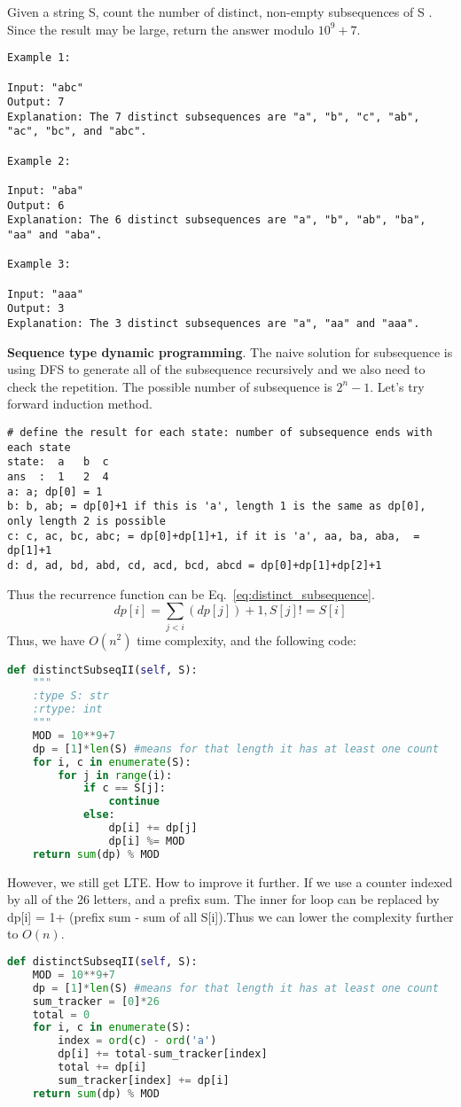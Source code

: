 \documentclass[../main.tex]{subfiles}
\begin{document}
Given a string S, count the number of distinct, non-empty subsequences of S . Since the result may be large, return the answer modulo $10^9 + 7$.
\begin{lstlisting}
Example 1:

Input: "abc"
Output: 7
Explanation: The 7 distinct subsequences are "a", "b", "c", "ab", "ac", "bc", and "abc".

Example 2:

Input: "aba"
Output: 6
Explanation: The 6 distinct subsequences are "a", "b", "ab", "ba", "aa" and "aba".

Example 3:

Input: "aaa"
Output: 3
Explanation: The 3 distinct subsequences are "a", "aa" and "aaa".
\end{lstlisting}
\textbf{Sequence type dynamic programming}. The naive solution for subsequence is using DFS to generate all of the subsequence recursively and we also need to check the repetition. The possible number of subsequence is $2^n-1$. Let's try forward induction method. 
\begin{lstlisting}
# define the result for each state: number of subsequence ends with each state
state:  a   b  c
ans  :  1   2  4 
a: a; dp[0] = 1
b: b, ab; = dp[0]+1 if this is 'a', length 1 is the same as dp[0], only length 2 is possible
c: c, ac, bc, abc; = dp[0]+dp[1]+1, if it is 'a', aa, ba, aba,  = dp[1]+1
d: d, ad, bd, abd, cd, acd, bcd, abcd = dp[0]+dp[1]+dp[2]+1
\end{lstlisting}
Thus the recurrence function can be Eq.~\ref{eq:distinct_subsequence}.
\begin{equation}
\label{eq:distinct_subsequence}
    dp[i] = \sum_{j<i}(dp[j]) +1, S[j] != S[i]
\end{equation}
Thus, we have $O(n^2)$ time complexity, and the following code:
\begin{lstlisting}[language=Python]
def distinctSubseqII(self, S):
    """
    :type S: str
    :rtype: int
    """
    MOD = 10**9+7
    dp = [1]*len(S) #means for that length it has at least one count
    for i, c in enumerate(S):
        for j in range(i):
            if c == S[j]:
                continue
            else:
                dp[i] += dp[j]
                dp[i] %= MOD
    return sum(dp) % MOD
\end{lstlisting}
However, we still get LTE. How to improve it further. If we use a counter indexed by all of the 26 letters, and a prefix sum. The inner for loop can be replaced by dp[i] = 1+ (prefix sum - sum of all S[i]).Thus we can lower the complexity further to $O(n)$.
\begin{lstlisting}[language=Python]
def distinctSubseqII(self, S):
    MOD = 10**9+7
    dp = [1]*len(S) #means for that length it has at least one count
    sum_tracker = [0]*26
    total = 0
    for i, c in enumerate(S):
        index = ord(c) - ord('a')
        dp[i] += total-sum_tracker[index]
        total += dp[i]
        sum_tracker[index] += dp[i]
    return sum(dp) % MOD
\end{lstlisting}
\end{document}

